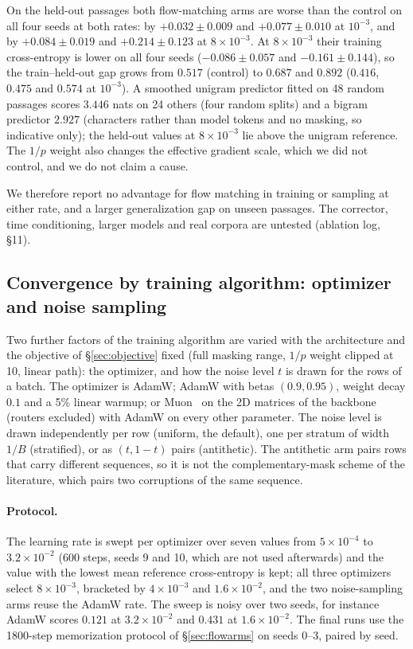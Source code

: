 \documentclass[11pt]{article}
\begin{document}
On the held-out passages both flow-matching arms are worse than the control on all four seeds at both rates: by
$+0.032\pm0.009$ and $+0.077\pm0.010$ at $10^{-3}$, and by $+0.084\pm0.019$ and $+0.214\pm0.123$ at $8\times10^{-3}$. At
$8\times10^{-3}$ their training cross-entropy is lower on all four seeds ($-0.086\pm0.057$ and $-0.161\pm0.144$), so the
train--held-out gap grows from $0.517$ (control) to $0.687$ and $0.892$ ($0.416$, $0.475$ and $0.574$ at $10^{-3}$).
A smoothed unigram predictor fitted on 48 random passages scores $3.446$ nats on 24 others (four random splits) and a
bigram predictor $2.927$ (characters rather than model tokens and no masking, so indicative only); the held-out values
at $8\times10^{-3}$ lie above the unigram reference. The $1/p$ weight also changes the effective gradient scale, which we
did not control, and we do not claim a cause.

We therefore report no advantage for flow matching in training or sampling at either rate, and a larger generalization
gap on unseen passages. The corrector, time conditioning, larger models and real corpora are untested (ablation log,
\S11).

\subsection{Convergence by training algorithm: optimizer and noise sampling}\label{sec:optarms}

Two further factors of the training algorithm are varied with the architecture and the objective of
\S\ref{sec:objective} fixed (full masking range, $1/p$ weight clipped at 10, linear path): the optimizer, and how the
noise level $t$ is drawn for the rows of a batch. The optimizer is AdamW; AdamW with betas $(0.9,0.95)$, weight decay $0.1$
and a 5\% linear warmup; or Muon~\citep{jordan2024muon} on the 2D matrices of the backbone (routers excluded) with AdamW on
every other parameter. The noise level is drawn independently per row (uniform, the default), one per stratum of width $1/B$
(stratified), or as $(t,1-t)$ pairs (antithetic). The antithetic arm pairs rows that carry different sequences, so it is not
the complementary-mask scheme of the literature, which pairs two corruptions of the same sequence.

\paragraph{Protocol.} The learning rate is swept per optimizer over seven values from $5\times10^{-4}$ to
$3.2\times10^{-2}$ (600 steps, seeds 9 and 10, which are not used afterwards) and the value with the lowest mean
reference cross-entropy is kept; all three optimizers select $8\times10^{-3}$, bracketed by $4\times10^{-3}$ and
$1.6\times10^{-2}$, and the two noise-sampling arms reuse the AdamW rate. The sweep is noisy over two seeds, for
instance AdamW scores $0.121$ at $3.2\times10^{-2}$ and $0.431$ at $1.6\times10^{-2}$. The final runs use the
1800-step memorization protocol of \S\ref{sec:flowarms} on seeds 0--3, paired by seed.
\end{document}

